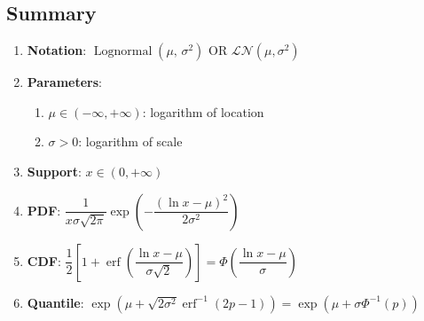 \subsection{Summary}

\begin{enumerate}
    \item \textbf{Notation}:
    ${\displaystyle \operatorname {Lognormal} \left(\mu ,\,\sigma ^{2}\right)}$
    OR
    $\mathcal{L N} (\mu, \sigma^2)$
    \hfill \cite{wiki/Log-normal_distribution, statistics/book/Statistics-for-Data-Scientists/Maurits-Kaptein}

    \item \textbf{Parameters}:
    \begin{enumerate}
        \item ${\displaystyle \mu \in (-\infty ,+\infty )}$: logarithm of location
        \hfill \cite{wiki/Log-normal_distribution, statistics/book/Statistics-for-Data-Scientists/Maurits-Kaptein}

        \item ${\displaystyle \sigma >0}$: logarithm of scale
        \hfill \cite{wiki/Log-normal_distribution, statistics/book/Statistics-for-Data-Scientists/Maurits-Kaptein}
    \end{enumerate}

    \item \textbf{Support}: ${\displaystyle x\in (0,+\infty )}$
    \hfill \cite{wiki/Log-normal_distribution, statistics/book/Statistics-for-Data-Scientists/Maurits-Kaptein}

    \item \textbf{PDF}:
    ${\displaystyle {\dfrac {1}{x\sigma {\sqrt {2\pi }}}}\exp \left(-{\dfrac {\left(\ln x-\mu \right)^{2}}{2\sigma ^{2}}}\right)}$
    \hfill \cite{wiki/Log-normal_distribution, statistics/book/Statistics-for-Data-Scientists/Maurits-Kaptein}

    \item \textbf{CDF}:
    $
        {\displaystyle {{\dfrac {1}{2}}\left[1+\operatorname {erf} \left({\dfrac {\ln x-\mu }{\sigma {\sqrt {2}}}}\right)\right]
        =\Phi {\left({\dfrac {\ln x-\mu }{\sigma }}\right)}}}
    $
    \hfill \cite{wiki/Log-normal_distribution}

    \item \textbf{Quantile}:
    $
        {\displaystyle {\exp \left(\mu +{\sqrt {2\sigma ^{2}}}\operatorname {erf} ^{-1}(2p-1)\right)
        =\exp(\mu +\sigma \Phi ^{-1}(p))}}
    $
    \hfill \cite{wiki/Log-normal_distribution}


\end{enumerate}
